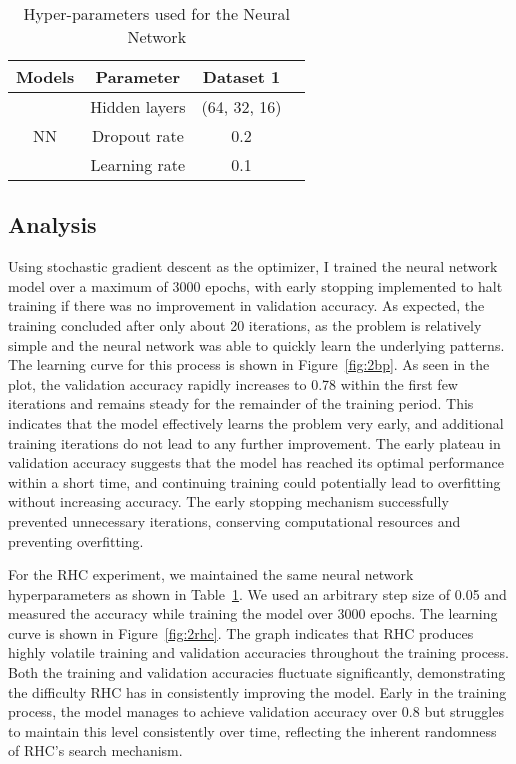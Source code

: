 \begin{table}[htbp]
\caption{Hyper-parameters used for the Neural Network}
\centering
\label{tab:nnhyperparams}
\begin{tabular}{|c|c|c|c|}
\hline
\textbf{Models} & \textbf{Parameter} & \textbf{Dataset 1} \\
\hline
\multirow{3}{*}{NN}  & Hidden layers & (64, 32, 16) \\
                     & Dropout rate & 0.2  \\
                     & Learning rate & 0.1 \\
\hline
\end{tabular}
\end{table}

\subsection{Analysis}
Using stochastic gradient descent as the optimizer, I trained the neural network model over a maximum of 3000 epochs, with early stopping implemented to halt training if there was no improvement in validation accuracy. As expected, the training concluded after only about 20 iterations, as the problem is relatively simple and the neural network was able to quickly learn the underlying patterns. The learning curve for this process is shown in Figure~\ref{fig:2bp}. As seen in the plot, the validation accuracy rapidly increases to 0.78 within the first few iterations and remains steady for the remainder of the training period. This indicates that the model effectively learns the problem very early, and additional training iterations do not lead to any further improvement. The early plateau in validation accuracy suggests that the model has reached its optimal performance within a short time, and continuing training could potentially lead to overfitting without increasing accuracy. The early stopping mechanism successfully prevented unnecessary iterations, conserving computational resources and preventing overfitting.

For the RHC experiment, we maintained the same neural network hyperparameters as shown in Table~\ref{tab:nnhyperparams}. We used an arbitrary step size of 0.05 and measured the accuracy while training the model over 3000 epochs. The learning curve is shown in Figure~\ref{fig:2rhc}. The graph indicates that RHC produces highly volatile training and validation accuracies throughout the training process. Both the training and validation accuracies fluctuate significantly, demonstrating the difficulty RHC has in consistently improving the model. Early in the training process, the model manages to achieve validation accuracy over 0.8 but struggles to maintain this level consistently over time, reflecting the inherent randomness of RHC’s search mechanism. 

